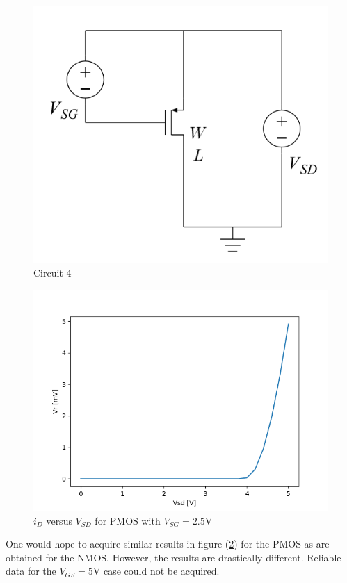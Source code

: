 \FloatBarrier

\begin{figure}[h!]
	\centering
	\includegraphics[scale=0.75]{./images/circuit_4.PNG}
	\caption{Circuit 4}
	\label{fig:circuit_4}
\end{figure}

\FloatBarrier

\FloatBarrier

\begin{figure}[h!]
	\centering
	\includegraphics[scale=0.75]{./images/data_4.PNG}
	\caption{$i_{D}$ versus $V_{SD}$ for PMOS with $V_{SG} = 2.5$\si{\volt}}
	\label{fig:data_4}
\end{figure}

\FloatBarrier

One would hope to acquire similar results in figure (\ref{fig:data_4}) for the PMOS as are obtained for the NMOS.
However, the results are drastically different.
Reliable data for the $V_{GS} = 5$\si{\volt} case could not be acquired.

